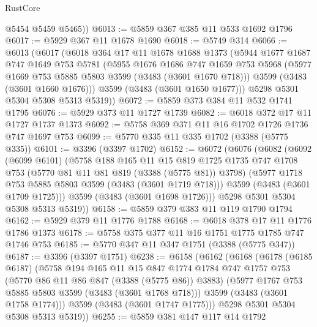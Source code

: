 \begin{lexlean}{RustCore}
\begin{coremodule}
        @5454
        @5459
        @5465))
@6013 := @5859 @367 @385 @11 @533 @1692 @1796
@6017 := @5929 @367 @11 @1678 @1690
@6018 := @5749 @314
@6066 := @6013
    (@6017
      (@6018
        @364
        @17
        @11
        @1678
        @1688
        @1373
        (@5944
          @1677
          @1687
          @747
          @1649
          @753
          @5781
          (@5955
            @1676
            @1686
            @747
            @1659
            @753
            @5968
            (@5977 @1669 @753 @5885 @5803 @3599 (@3483 (@3601 @1670 @718)))
            @3599
            (@3483 (@3601 @1660 @1676)))
          @3599
          (@3483 (@3601 @1650 @1677)))
        @5298
        @5301
        @5304
        @5308
        @5313
        @5319))
@6072 := @5859 @373 @384 @11 @532 @1741 @1795
@6076 := @5929 @373 @11 @1727 @1739
@6082 := @6018 @372 @17 @11 @1727 @1737 @1373
@6092 := @5758 @369 @371 @11 @16 @1702 @1726 @1736 @747 @1697 @753
@6099 := @5770 @335 @11 @335 @1702 (@3388 (@5775 @335))
@6101 := @3396 (@3397 @1702)
@6152 := @6072
    (@6076
      (@6082
        (@6092
          (@6099 @6101)
          (@5758
            @188
            @165
            @11
            @15
            @819
            @1725
            @1735
            @747
            @1708
            @753
            (@5770 @81 @11 @81 @819 (@3388 (@5775 @81)) @3798)
            (@5977 @1718 @753 @5885 @5803 @3599 (@3483 (@3601 @1719 @718)))
            @3599
            (@3483 (@3601 @1709 @1725)))
          @3599
          (@3483 (@3601 @1698 @1726)))
        @5298
        @5301
        @5304
        @5308
        @5313
        @5319))
@6158 := @5859 @379 @383 @11 @119 @1790 @1794
@6162 := @5929 @379 @11 @1776 @1788
@6168 := @6018 @378 @17 @11 @1776 @1786 @1373
@6178 := @5758 @375 @377 @11 @16 @1751 @1775 @1785 @747 @1746 @753
@6185 := @5770 @347 @11 @347 @1751 (@3388 (@5775 @347))
@6187 := @3396 (@3397 @1751)
@6238 := @6158
    (@6162
      (@6168
        (@6178
          (@6185 @6187)
          (@5758
            @194
            @165
            @11
            @15
            @847
            @1774
            @1784
            @747
            @1757
            @753
            (@5770 @86 @11 @86 @847 (@3388 (@5775 @86)) @3883)
            (@5977 @1767 @753 @5885 @5803 @3599 (@3483 (@3601 @1768 @718)))
            @3599
            (@3483 (@3601 @1758 @1774)))
          @3599
          (@3483 (@3601 @1747 @1775)))
        @5298
        @5301
        @5304
        @5308
        @5313
        @5319))
@6255 := @5859
    @381
    @147
    @117
    @14
    @1792

\end{coremodule}
\end{lexlean}
